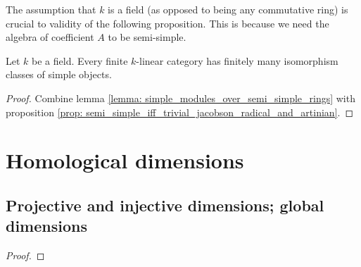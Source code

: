            \begin{remark}
                The assumption that $k$ is a field (as opposed to being any commutative ring) is crucial to validity of the following proposition. This is because we need the algebra of coefficient $A$ to be semi-simple. 
            \end{remark}
            \begin{proposition} \label{prop: simple_objects_in_finite_linear_categories}
                Let $k$ be a field. Every finite $k$-linear category has finitely many isomorphism classes of simple objects. 
            \end{proposition}
                \begin{proof}
                    Combine lemma \ref{lemma: simple_modules_over_semi_simple_rings} with proposition \ref{prop: semi_simple_iff_trivial_jacobson_radical_and_artinian}.
                \end{proof}
        
    \section{Homological dimensions}
        \subsection{Projective and injective dimensions; global dimensions}
            \begin{lemma} \label{lemma: schaunel_lemma}
                \cite[\href{https://stacks.math.columbia.edu/tag/00O3}{Tag 00O3}]{stacks}
            \end{lemma}
                \begin{proof}
                    
                \end{proof}
        
